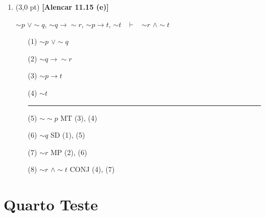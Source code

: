 \documentclass[12pt,a4paper,oneside]{article}
\begin{document}
\begin{enumerate}
\begin{enumerate}
		\item (3,0 pt) {\bf [Alencar 11.15 (e)]} 
		\begin{center}
			$\sim p$ $\vee \sim q$, $\sim q \rightarrow \sim r$, $\sim p \rightarrow t$, $\sim t$ 
			\ $\vdash$ \ $\sim r$ $\wedge \sim t$
		\end{center}
		{\color{blue}
			\begin{itemize}
				\item[(1)] $\sim p$ $\vee \sim q$ 
				\item[(2)] $\sim q \rightarrow \sim r$
				\item[(3)] $\sim p \rightarrow t$ 
				\item[(4)] $\sim t$ \\
				\rule{3cm}{0.5pt}
				\item[(5)] $\sim \sim p$ \hspace*{0.7cm} MT (3), (4)
				\item[(6)] $\sim q$ \hspace*{1.1cm} SD (1), (5)
				\item[(7)] $\sim r$ \hspace*{1.1cm} MP (2), (6)
				\item[(8)] $\sim r$ $\wedge \sim t$ \hspace*{0.1cm} CONJ (4), (7)
			\end{itemize}
		}
		\vspace*{0.3cm}
		
	\end{enumerate}
	
	\section*{Quarto Teste}
	

\end{enumerate}
\end{document}
